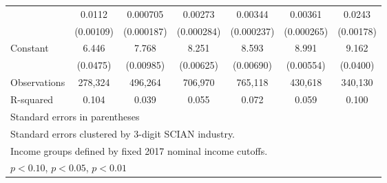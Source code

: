 \begin{table}[htbp]
\begin{tabular}{l*{6}{c}}
{\addlinespace
Years of Schooling  &      0.0112\sym{***}&    0.000705\sym{***}&     0.00273\sym{***}&     0.00344\sym{***}&     0.00361\sym{***}&      0.0243\sym{***}\\
                    &   (0.00109)         &  (0.000187)         &  (0.000284)         &  (0.000237)         &  (0.000265)         &   (0.00178)         \\
\addlinespace
Constant            &       6.446\sym{***}&       7.768\sym{***}&       8.251\sym{***}&       8.593\sym{***}&       8.991\sym{***}&       9.162\sym{***}\\
                    &    (0.0475)         &   (0.00985)         &   (0.00625)         &   (0.00690)         &   (0.00554)         &    (0.0400)         \\
\midrule
Observations        &     278,324         &     496,264         &     706,970         &     765,118         &     430,618         &     340,130         \\
R-squared           &       0.104         &       0.039         &       0.055         &       0.072         &       0.059         &       0.100         \\
\bottomrule
\multicolumn{7}{l}{\footnotesize Standard errors in parentheses}\\
\multicolumn{7}{l}{\footnotesize Standard errors clustered by 3-digit SCIAN industry.}\\
\multicolumn{7}{l}{\footnotesize Income groups defined by fixed 2017 nominal income cutoffs.}\\
\multicolumn{7}{l}{\footnotesize \sym{*} \(p<0.10\), \sym{**} \(p<0.05\), \sym{***} \(p<0.01\)}\\
\end{tabular}
\end{table}
